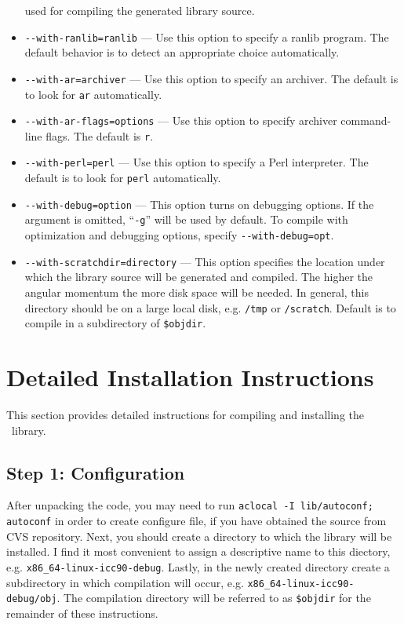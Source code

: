 \documentclass[12pt]{article}
\begin{document}
\begin{itemize}
  used for compiling the generated library source. 
\item {\tt -}{\tt -with-ranlib=ranlib} --- Use this option to specify
  a ranlib program. The default behavior is to detect an appropriate
  choice automatically.
\item {\tt -}{\tt -with-ar=archiver} --- Use this option to specify an
  archiver.  The default is to look for {\tt ar} automatically.
\item {\tt -}{\tt -with-ar-flags=options} --- Use this option to specify
  archiver command-line flags. The default is {\tt r}.
\item {\tt -}{\tt -with-perl=perl} --- Use this option to specify a
  Perl interpreter.  The default is to look for {\tt perl} automatically.
\item {\tt -}{\tt -with-debug=option} --- This option turns on debugging
  options.  If the argument is omitted, ``{\tt -g}'' will be used by default.
  To compile with optimization and debugging options, specify {\tt -}{\tt -with-debug=opt}.
\item {\tt -}{\tt -with-scratchdir=directory} --- This option specifies the location
  under which the library source will be generated and compiled. The higher the angular
  momentum the more disk space will be needed. In general, this directory should be
  on a large local disk, e.g. {\tt /tmp} or {\tt /scratch}. Default is to compile
  in a subdirectory of {\tt \$objdir}.
\end{itemize}

\section{Detailed Installation Instructions}

This section provides detailed instructions for compiling and
installing the \LIBINT\ library.  

\subsection{Step 1: Configuration}

After unpacking the code, you may need to run {\tt aclocal -I lib/autoconf; autoconf}
in order to create configure file, if you have obtained the source from CVS repository.
Next, you should create a directory to which the library will be installed.
I find it most convenient to assign a descriptive name to this diectory, e.g.
{\tt x86\_64-linux-icc90-debug}. Lastly, in the newly created directory
create a subdirectory in which compilation will occur, e.g.
{\tt x86\_64-linux-icc90-debug/obj}. The compilation directory will be referred to as {\tt \$objdir}
for the remainder of these instructions.
\end{document}
